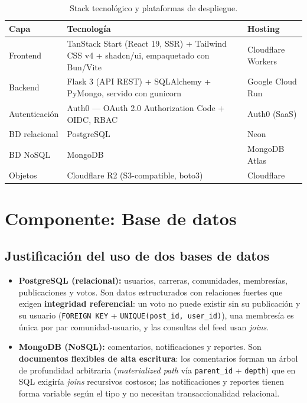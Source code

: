\documentclass{article}
\begin{document}
\begin{table}[H]
\setlength{\tabcolsep}{0.4em}
{\renewcommand{\arraystretch}{1.3}
\begin{tabular}{|p{3cm}|p{6.6cm}|p{4.6cm}|}
    \hline
    \rowcolor{tablebackground}
    \color{white}\textbf{Capa} & \color{white}\textbf{Tecnología} & \color{white}\textbf{Hosting} \\
    \hline
    Frontend & TanStack Start (React 19, SSR) + Tailwind CSS v4 + shadcn/ui, empaquetado con Bun/Vite & Cloudflare Workers \\
    \hline
    Backend & Flask 3 (API REST) + SQLAlchemy + PyMongo, servido con gunicorn & Google Cloud Run \\
    \hline
    Autenticación & Auth0 — OAuth 2.0 Authorization Code + OIDC, RBAC & Auth0 (SaaS) \\
    \hline
    BD relacional & PostgreSQL & Neon \\
    \hline
    BD NoSQL & MongoDB & MongoDB Atlas \\
    \hline
    Objetos & Cloudflare R2 (S3-compatible, boto3) & Cloudflare \\
    \hline
\end{tabular}}
\caption{Stack tecnológico y plataformas de despliegue.}
\end{table}

\section{Componente: Base de datos}

\subsection{Justificación del uso de dos bases de datos}

\begin{itemize}[itemsep=2pt]
    \item \textbf{PostgreSQL (relacional):} usuarios, carreras, comunidades,
    membresías, publicaciones y votos. Son datos estructurados con relaciones
    fuertes que exigen \textbf{integridad referencial}: un voto no puede
    existir sin su publicación y su usuario
    (\texttt{FOREIGN KEY} + \texttt{UNIQUE(post\_id, user\_id)}), una
    membresía es única por par comunidad-usuario, y las consultas del feed
    usan \textit{joins}.
    \item \textbf{MongoDB (NoSQL):} comentarios, notificaciones y reportes.
    Son \textbf{documentos flexibles de alta escritura}: los comentarios
    forman un árbol de profundidad arbitraria (\textit{materialized path} vía
    \texttt{parent\_id} + \texttt{depth}) que en SQL exigiría \textit{joins}
    recursivos costosos; las notificaciones y reportes tienen forma variable
    según el tipo y no necesitan transaccionalidad relacional.
\end{itemize}
\end{document}
